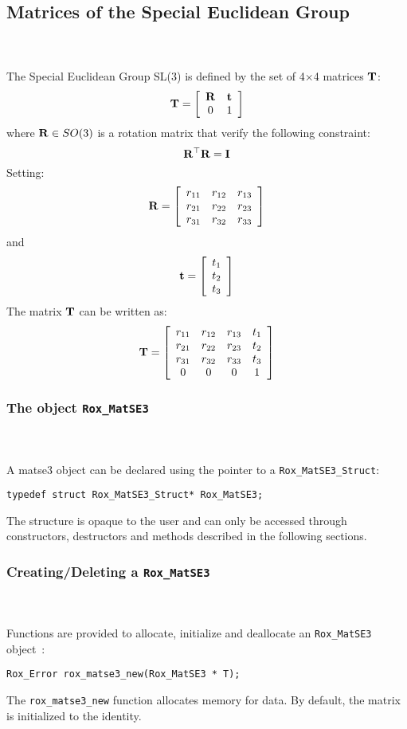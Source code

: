 \subsection{Matrices of the Special Euclidean Group}
\label{sse:matse3}
~\\~\\
The Special Euclidean Group SL(3) is defined by the set of 4$\times$4 matrices ${\bf T}$:
\[
{\bf T} = \left[\begin{array}{cc} {\bf R} & {\bf t} \\ 0 & 1 \end{array} \right]
\]
where ${\bf R} \in SO(3)$ is a rotation matrix that verify the following constraint:
\[
{\bf R}^\top {\bf R} = {\bf I}
\] 
Setting:
\[
{\bf R} = \left[ \begin{array}{ccc} r_{11} & r_{12} & r_{13} \\ r_{21} & r_{22} & r_{23} \\ r_{31} & r_{32} & r_{33} \end{array} \right]
\]
and
\[
{\bf t} = \left[ \begin{array}{c}  t_1 \\ t_2 \\ t_3 \end{array} \right]
\]
The matrix ${\bf T}$ can be written as:
\[
{\bf T} = \left[ \begin{array}{cccc} r_{11} & r_{12} & r_{13} & t_1 \\ r_{21} & r_{22} & r_{23} & t_2 \\ r_{31} & r_{32} & r_{33} & t_3 \\ 0 & 0 & 0 & 1 \end{array} \right]
\]

\subsubsection{The object {\tt Rox\_MatSE3}}
\label{sss:matse3}
~\\~\\
A matse3 object can be declared using the pointer to a \lstinline$Rox_MatSE3_Struct$: 

\begin{lstlisting}
typedef struct Rox_MatSE3_Struct* Rox_MatSE3;
\end{lstlisting}

The structure is opaque to the user and can only be accessed through constructors, destructors and methods described in the following sections.

\subsubsection{Creating/Deleting a {\tt Rox\_MatSE3}}
\label{sss:matse3_delnew}
~\\~\\
Functions are provided to allocate, initialize and deallocate an \lstinline$Rox_MatSE3$ object~:
\begin{lstlisting}
Rox_Error rox_matse3_new(Rox_MatSE3 * T);
\end{lstlisting}
The \lstinline$rox_matse3_new$ function allocates memory for data. By default, the matrix is initialized to the identity.\\ 

